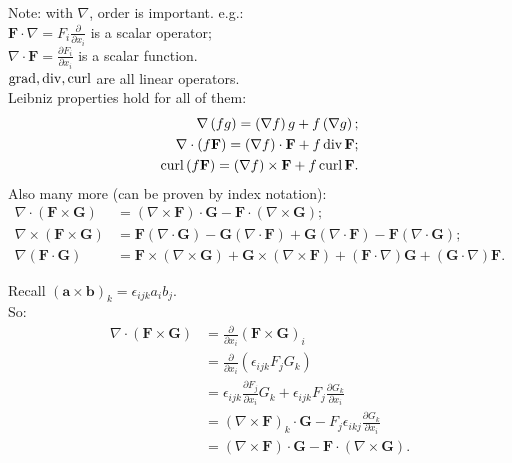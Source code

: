 \documentclass[a4paper]{article}
\begin{document}
Note: with $\nabla$, order is important. e.g.:\\
$\mathbf{F}\cdot\nabla=F_i \frac{\partial}{\partial x_i}$ is a scalar operator;\\
$\nabla\cdot\mathbf{F}=\frac{\partial F_i}{\partial x_i}$ is a scalar function.\\
$\operatorname{grad},\operatorname{div},\operatorname{curl}$ are all linear operators.\\
Leibniz properties hold for all of them:\\
\begin{equation*}
\begin{aligned}
\nabla\left(fg\right)=\left(\nabla f\right)g+f\left(\nabla g\right);\\
\nabla\cdot\left(f\mathbf{F}\right)=\left(\nabla f\right)\cdot\mathbf{F}+f\operatorname{div} \mathbf{F};\\
\operatorname{curl}\left(f\mathbf{F}\right)=\left(\nabla f\right)\times\mathbf{F}+f\operatorname{curl}\mathbf{F}.
\end{aligned}
\end{equation*}
Also many more (can be proven by index notation):\\
\begin{equation*}
\begin{aligned}
\nabla\cdot\left(\mathbf{F\times\mathbf{G}}\right)&=\left(\nabla\times\mathbf{F}\right)\cdot\mathbf{G}-\mathbf{F}\cdot\left(\nabla\times\mathbf{G}\right);\\
\nabla\times\left(\mathbf{F}\times\mathbf{G}\right)&=\mathbf{F}\left(\nabla\cdot\mathbf{G}\right)-\mathbf{G}\left(\nabla\cdot\mathbf{F}\right)+\mathbf{G}\left(\nabla\cdot\mathbf{F}\right)-\mathbf{F}\left(\nabla\cdot\mathbf{G}\right);\\
\nabla\left(\mathbf{F}\cdot\mathbf{G}\right) &= \mathbf{F}\times\left(\nabla\times\mathbf{G}\right)+\mathbf{G}\times\left(\nabla\times\mathbf{F}\right)+\left(\mathbf{F}\cdot\nabla\right)\mathbf{G}+\left(\mathbf{G}\cdot\nabla\right)\mathbf{F}.
\end{aligned}
\end{equation*}

\begin{eg}
Recall $\left(\mathbf{a}\times\mathbf{b}\right)_k=\epsilon_{ijk}a_i b_j$.\\
So:\\
\begin{equation*}
\begin{aligned}
\nabla\cdot\left(\mathbf{F}\times\mathbf{G}\right)&=\frac{\partial}{\partial x_i}\left(\mathbf{F}\times\mathbf{G}\right)_i\\
&=\frac{\partial}{\partial x_i}\left(\epsilon_{ijk}F_j G_k\right)\\
&=\epsilon_{ijk}\frac{\partial F_j}{\partial x_i} G_k + \epsilon_{ijk} F_j \frac{\partial G_k}{\partial x_i}\\
&=\left(\nabla\times\mathbf{F}\right)_k\cdot\mathbf{G}-F_j \epsilon_{ikj}\frac{\partial G_k}{\partial x_i}\\
&=\left(\nabla\times\mathbf{F}\right)\cdot\mathbf{G}-\mathbf{F}\cdot\left(\nabla\times\mathbf{G}\right).
\end{aligned}
\end{equation*}
\end{eg}
\end{document}
